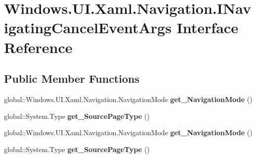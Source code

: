 \hypertarget{interface_windows_1_1_u_i_1_1_xaml_1_1_navigation_1_1_i_navigating_cancel_event_args}{}\section{Windows.\+U\+I.\+Xaml.\+Navigation.\+I\+Navigating\+Cancel\+Event\+Args Interface Reference}
\label{interface_windows_1_1_u_i_1_1_xaml_1_1_navigation_1_1_i_navigating_cancel_event_args}
\subsection*{Public Member Functions}
\begin{DoxyCompactItemize}
\item 
\mbox{\label{interface_windows_1_1_u_i_1_1_xaml_1_1_navigation_1_1_i_navigating_cancel_event_args_a8acff91018a3d93f50617c9a48b0c289}} 
global\+::\+Windows.\+U\+I.\+Xaml.\+Navigation.\+Navigation\+Mode {\bfseries get\+\_\+\+Navigation\+Mode} ()
\item 
\mbox{\label{interface_windows_1_1_u_i_1_1_xaml_1_1_navigation_1_1_i_navigating_cancel_event_args_a07df841493a0cda65a658ad6e960d974}} 
global\+::\+System.\+Type {\bfseries get\+\_\+\+Source\+Page\+Type} ()
\item 
\mbox{\label{interface_windows_1_1_u_i_1_1_xaml_1_1_navigation_1_1_i_navigating_cancel_event_args_a8acff91018a3d93f50617c9a48b0c289}} 
global\+::\+Windows.\+U\+I.\+Xaml.\+Navigation.\+Navigation\+Mode {\bfseries get\+\_\+\+Navigation\+Mode} ()
\item 
\mbox{\label{interface_windows_1_1_u_i_1_1_xaml_1_1_navigation_1_1_i_navigating_cancel_event_args_a07df841493a0cda65a658ad6e960d974}} 
global\+::\+System.\+Type {\bfseries get\+\_\+\+Source\+Page\+Type} ()
\item 
\mbox{\label{interface_windows_1_1_u_i_1_1_xaml_1_1_navigation_1_1_i_navigating_cancel_event_args_a8acff91018a3d93f50617c9a48b0c289}} 

\end{DoxyCompactItemize}
